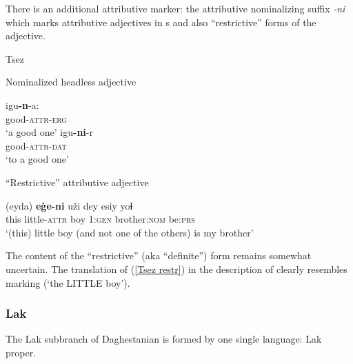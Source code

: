 There is an additional attributive marker: the attributive nominalizing suffix \textit{-ni} which marks attributive adjectives in s and also “restrictive” forms of the adjective.
\begin{exe}
\ex 
\rm{Tsez \citep{alekseev-etal2004}}
\begin{xlist}
\ex	
\rm{Nominalized headless adjective}
\begin{xlist}
\ex
\gll	igu\textbf{-n}-a:\\
	good-\textsc{attr}-\textsc{erg}\\
\glt	‘a good one’
\ex
\gll	igu\textbf{-ni}-r\\
	good-\textsc{attr}-\textsc{dat}\\
\glt	‘to a good one’
\end{xlist}

\ex	
\rm{“Restrictive” attributive adjective}
\begin{xlist}
\ex	
\label{Tsez restr}
\gll	(eyda) \textbf{eġe-ni} uži dey esiy yoɬ\\
	this little-\textsc{attr} boy \textsc{1:gen} brother:\textsc{nom} be:\textsc{prs}\\
\glt	‘(this) little boy (and not one of the others) is my brother’
\end{xlist}
\end{xlist}
\end{exe}
The content of the “restrictive” (aka “definite”) form remains somewhat uncertain. The translation of (\ref{Tsez restr}) in the description of \citet[128]{alekseev-etal2004} clearly resembles  marking (‘the LITTLE boy’).

\subsubsection{Lak}
The Lak subbranch of Daghestanian is formed by one single language: Lak proper.


